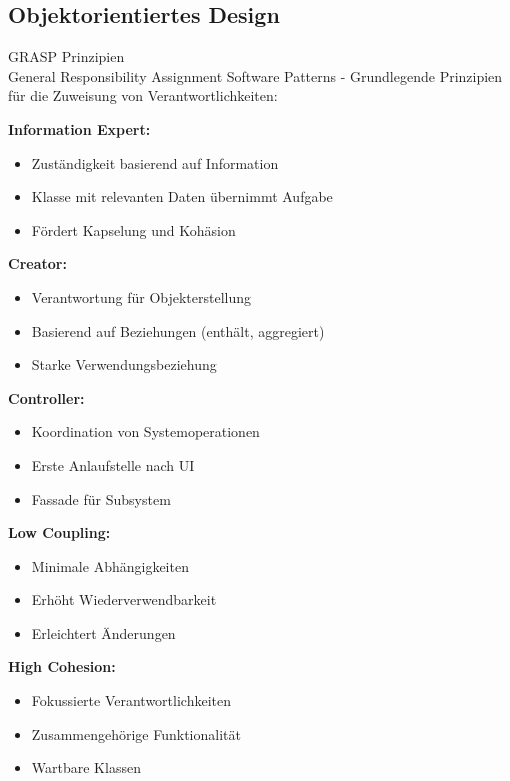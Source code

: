 \subsection{Objektorientiertes Design}

\begin{concept}{GRASP Prinzipien}\\
General Responsibility Assignment Software Patterns - Grundlegende Prinzipien für die Zuweisung von Verantwortlichkeiten:

\textbf{Information Expert:}
\begin{itemize}
    \item Zuständigkeit basierend auf Information
    \item Klasse mit relevanten Daten übernimmt Aufgabe
    \item Fördert Kapselung und Kohäsion
\end{itemize}

\textbf{Creator:}
\begin{itemize}
    \item Verantwortung für Objekterstellung
    \item Basierend auf Beziehungen (enthält, aggregiert)
    \item Starke Verwendungsbeziehung
\end{itemize}

\textbf{Controller:}
\begin{itemize}
    \item Koordination von Systemoperationen
    \item Erste Anlaufstelle nach UI
    \item Fassade für Subsystem
\end{itemize}

\textbf{Low Coupling:}
\begin{itemize}
    \item Minimale Abhängigkeiten
    \item Erhöht Wiederverwendbarkeit
    \item Erleichtert Änderungen
\end{itemize}

\textbf{High Cohesion:}
\begin{itemize}
    \item Fokussierte Verantwortlichkeiten
    \item Zusammengehörige Funktionalität
    \item Wartbare Klassen
\end{itemize}


\end{concept}
